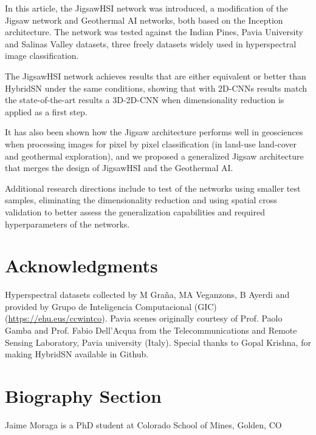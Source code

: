 \documentclass[lettersize, journal]{IEEEtran}
\begin{document}
In this article, the JigsawHSI network was introduced, a modification of the Jigsaw network and Geothermal AI networks, both based on the Inception architecture. The network was tested against the Indian Pines, Pavia University and Salinas Valley datasets, three freely datasets widely used in hyperspectral image classification.

The JigsawHSI network achieves results that are either equivalent or better than HybridSN under the same conditions, showing that with 2D-CNNs results match the state-of-the-art results a 3D-2D-CNN when dimensionality reduction is applied as a first step.

It has also been shown how the Jigsaw architecture performs well in geosciences when processing images for pixel by pixel classification (in land-use land-cover and geothermal exploration), and we proposed a generalized Jigsaw architecture that merges the design of JigsawHSI and the Geothermal AI.

Additional research directions include to test of the networks using smaller test samples, eliminating the dimensionality reduction and using spatial cross validation to better assess the generalization capabilities and required hyperparameters of the networks.


\section*{Acknowledgments}
Hyperspectral datasets collected by M Graña, MA Veganzons, B Ayerdi and provided by Grupo de Inteligencia Computacional (GIC) (\href{https://www.ehu.eus/ccwintco/index.php/Hyperspectral_Remote_Sensing_Scenes}{https://ehu.eus/ccwintco}). Pavia scenes originally courtesy of Prof. Paolo Gamba and Prof. Fabio Dell'Acqua from the Telecommunications and Remote Sensing Laboratory, Pavia university (Italy). 
Special thanks to Gopal Krishna, for making HybridSN available in Github.






\newpage

\section{Biography Section}
\vspace{11pt}

\begin{IEEEbiography}{Jaime Moraga} is a PhD student at Colorado School of Mines,
Golden, CO
\end{IEEEbiography}
\end{document}
